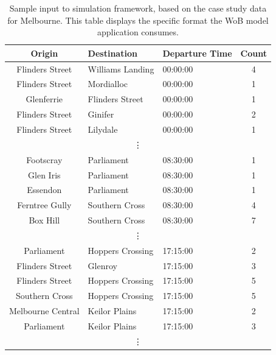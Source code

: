 \begin{table}[ht]
    \centering
    \caption[Sample input to simulation framework]{Sample input to simulation framework, based on the case study data for Melbourne. This table displays the specific format the WoB model application consumes.}
    \begin{tabular}{cllc}
        Origin         & Destination       & Departure Time  & Count \\ \hline
        Flinders Street & Williams Landing    & 00:00:00       &           4 \\
        Flinders Street & Mordialloc          & 00:00:00       &           1 \\
        Glenferrie      & Flinders Street     & 00:00:00       &           1 \\
        Flinders Street & Ginifer             & 00:00:00       &           2 \\
        Flinders Street & Lilydale            & 00:00:00       &           1 \\
        \multicolumn{4}{c}{\vdots}\\
        Footscray       & Parliament              & 08:30:00       &           1 \\
        Glen Iris       & Parliament            & 08:30:00       &           1 \\
        Essendon        & Parliament             & 08:30:00       &           1 \\
        Ferntree Gully  & Southern Cross       & 08:30:00       &           4 \\
        Box Hill        & Southern Cross       & 08:30:00       &           7 \\
        \multicolumn{4}{c}{\vdots}\\
        Parliament          & Hoppers Crossing &  17:15:00       &           2 \\
        Flinders Street     & Glenroy          &  17:15:00       &           3 \\
        Flinders Street     & Hoppers Crossing &  17:15:00       &           5 \\
        Southern Cross      & Hoppers Crossing &  17:15:00       &           5 \\
        Melbourne Central   & Keilor Plains    &  17:15:00       &           2 \\
        Parliament          & Keilor Plains    &  17:15:00       &           3 \\
        \multicolumn{4}{c}{\vdots}\\
    \end{tabular}
    \label{tab:SimInput}
\end{table}

